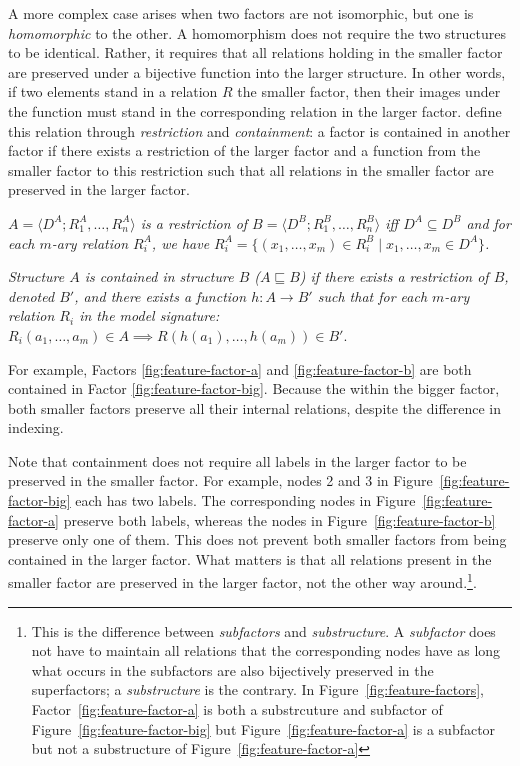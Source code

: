 A more complex case arises when two factors are not isomorphic, but one is
\emph{homomorphic} to the other. A homomorphism does not require the two
structures to be identical. Rather, it requires that all relations holding in
the smaller factor are preserved under a bijective function into the larger structure.
In other words, if two elements stand in a relation \(R\) the smaller factor,
then their images under the function must stand in the corresponding relation
in the larger factor. \citet{chandleeBufia2019} define this relation through
\textit{restriction} and \textit{containment}: a factor is contained in another
factor if there exists a restriction of the larger factor and a function from
the smaller factor to this restriction such that all relations in the smaller
factor are preserved in the larger factor.

\begin{definition}
	\label{def.res}
	\textit{ $A= \langle D^A; R^A_1, \ldots, R^A_n \rangle$ is a \emph{restriction}
		of $B
		= \langle D^B; R^B_1, \ldots, R^B_n \rangle$ iff $D^A \subseteq D^B$ and for
		each $m$-ary relation $R^A_i$, we have $R^A_i = \{(x_1, \ldots, x_m) \in R^B_i \mid x_1, \ldots, x_m \in D^A\}$. }
\end{definition}

\begin{definition}
	\label{def.contain}
	\textit{Structure $A$ is \emph{contained} in structure $B$
		($A \sqsubseteq B$) if there exists a restriction of $B$, denoted
		$B'$, and there exists a function $h:A \rightarrow B'$ such that for
		each $m$-ary relation $R_i$ in the model signature:
		\(R_i(a_1, \ldots, a_m) \in A \implies R(h(a_1), \ldots, h(a_m)) \in B'.\)}
\end{definition}


For example, Factors \ref{fig:feature-factor-a} and \ref{fig:feature-factor-b}
are both contained in Factor \ref{fig:feature-factor-big}. Because the within 
the bigger factor, both smaller factors preserve all their internal relations,
despite the difference in indexing. 

Note that containment does not require all labels in the larger factor to be
preserved in the smaller factor. For example, nodes 2 and 3 in
Figure~\ref{fig:feature-factor-big} each has two labels. The corresponding
nodes in Figure~\ref{fig:feature-factor-a} preserve both labels, whereas the
nodes in Figure~\ref{fig:feature-factor-b} preserve only one of
them. This does not prevent both smaller factors from being contained in the
larger factor. What matters is that all relations present in the smaller factor
are preserved in the larger factor, not the other way around.\footnote{This is
the difference between \textit{subfactors} and \textit{substructure}. A \textit{subfactor} does not have to maintain all relations that the corresponding nodes have as long what occurs in the subfactors are also bijectively preserved in the superfactors; a \textit{substructure} is the contrary. In Figure~\ref{fig:feature-factors}, Factor~\ref{fig:feature-factor-a} is both a substrcuture and subfactor of Figure~\ref{fig:feature-factor-big} but Figure~\ref{fig:feature-factor-a} is a subfactor but not a substructure of Figure~\ref{fig:feature-factor-a}}.



